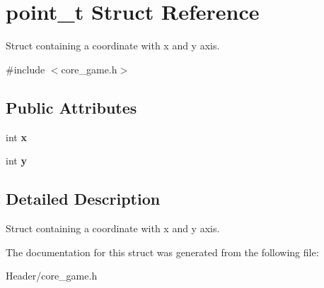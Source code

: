 \hypertarget{structpoint__t}{}\section{point\+\_\+t Struct Reference}
\label{structpoint__t}


Struct containing a coordinate with x and y axis.  




{\ttfamily \#include $<$core\+\_\+game.\+h$>$}

\subsection*{Public Attributes}
\begin{DoxyCompactItemize}
\item 
\mbox{\label{structpoint__t_a8c2e3bf26d194ce8ffdf84bb501602d4}} 
int {\bfseries x}
\item 
\mbox{\label{structpoint__t_ad320c37ee9949e4874a505483d2f6907}} 
int {\bfseries y}
\end{DoxyCompactItemize}


\subsection{Detailed Description}
Struct containing a coordinate with x and y axis. 

The documentation for this struct was generated from the following file\+:\begin{DoxyCompactItemize}
\item 
Header/core\+\_\+game.\+h\end{DoxyCompactItemize}
